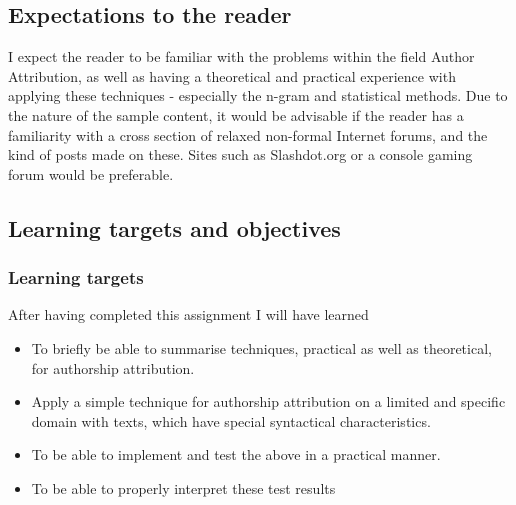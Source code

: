 \subsection{Expectations to the reader}
\label{expectations}
I expect the reader to be familiar with the problems within the field Author Attribution, as well as having a theoretical and practical experience with applying these techniques - especially the n-gram and statistical methods. Due to the nature of the sample content, it would be advisable if the reader has a familiarity with a cross section of relaxed non-formal Internet forums, and the kind of posts made on these. Sites such as Slashdot.org or a console gaming forum would be preferable.

\subsection{Learning targets and objectives}
\label{learning}
\subsubsection{Learning targets}
After having completed this assignment I will have learned 
\begin{itemize}
\item To briefly be able to summarise techniques, practical as well as theoretical, for authorship attribution.
\item Apply a simple technique for authorship attribution on a limited and specific domain with texts, which have special syntactical characteristics.
\item To be able to implement and test the above in a practical manner.
\item To be able to properly interpret these test results
\end{itemize}

